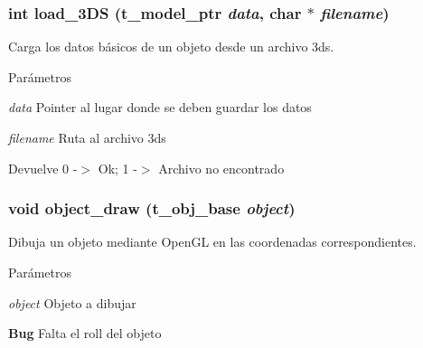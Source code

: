 \subsubsection[{load\_\-3DS}]{\setlength{\rightskip}{0pt plus 5cm}int load\_\-3DS ({\bf t\_\-model\_\-ptr} {\em data}, \/  char $\ast$ {\em filename})}\label{objetos_8c_a191f00b4d95e50b73000ed459c27ee37}


Carga los datos básicos de un objeto desde un archivo 3ds. 
\begin{DoxyParams}{Parámetros}
\item[{\em data}]Pointer al lugar donde se deben guardar los datos \item[{\em filename}]Ruta al archivo 3ds \end{DoxyParams}
\begin{DoxyReturn}{Devuelve}
0 -\/$>$ Ok; 1 -\/$>$ Archivo no encontrado 
\end{DoxyReturn}
\subsubsection[{object\_\-draw}]{\setlength{\rightskip}{0pt plus 5cm}void object\_\-draw ({\bf t\_\-obj\_\-base} {\em object})}\label{objetos_8c_a0ac96b56eb1c63648a05e7c1fc4a857b}


Dibuja un objeto mediante OpenGL en las coordenadas correspondientes. 
\begin{DoxyParams}{Parámetros}
\item[{\em object}]Objeto a dibujar \end{DoxyParams}
\begin{Desc}
\item[{\bf Bug}]Falta el roll del objeto \end{Desc}
